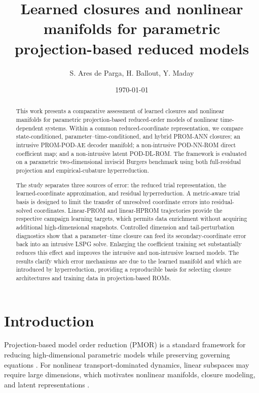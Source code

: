 \documentclass[11pt]{article}
\title{\vspace{-1.5em}
Learned closures and nonlinear manifolds for parametric projection-based reduced models}
\author{S. Ares de Parga, H. Ballout, Y. Maday}
\date{\today}
\begin{document}
\maketitle
\vspace{-1.0em}

\begin{abstract}
This work presents a comparative assessment of learned closures and nonlinear
manifolds for parametric projection-based reduced-order models of nonlinear
time-dependent systems. Within a common reduced-coordinate representation, we
compare state-conditioned, parameter--time-conditioned, and hybrid
\textsc{PROM-ANN} closures; an intrusive \textsc{PROM-POD-AE} decoder manifold;
a non-intrusive \textsc{POD-NN-ROM} direct coefficient map; and a
non-intrusive latent \textsc{POD-DL-ROM}. The framework is evaluated on a
parametric two-dimensional inviscid Burgers benchmark using both full-residual
projection and empirical-cubature hyperreduction.

The study separates three sources of error: the reduced trial representation,
the learned-coordinate approximation, and residual hyperreduction. A
metric-aware trial basis is designed to limit the transfer of unresolved
coordinate errors into residual-solved coordinates. Linear-PROM and
linear-HPROM trajectories provide the respective campaign learning targets,
which permits data enrichment without acquiring additional high-dimensional
snapshots. Controlled
dimension and tail-perturbation diagnostics show that a parameter--time
closure can feed its secondary-coordinate error back into an intrusive LSPG
solve. Enlarging the coefficient training set substantially reduces this
effect and improves the intrusive and non-intrusive learned models. The
results clarify which error mechanisms are due to the learned manifold and
which are introduced by hyperreduction, providing a reproducible basis for
selecting closure architectures and training data in projection-based ROMs.
\end{abstract}

\vspace{-1.0em}

\section{Introduction}
Projection-based model order reduction (PMOR) is a standard framework for reducing high-dimensional parametric models while preserving governing equations \cite{antoulas2005approximation,quarteroni2014reduced}. For nonlinear transport-dominated dynamics, linear subspaces may require large dimensions, which motivates nonlinear manifolds, closure modeling, and latent representations \cite{barnett2023neural,cohen2023nonlinear,aghili2026nonlinear}.
\end{document}
